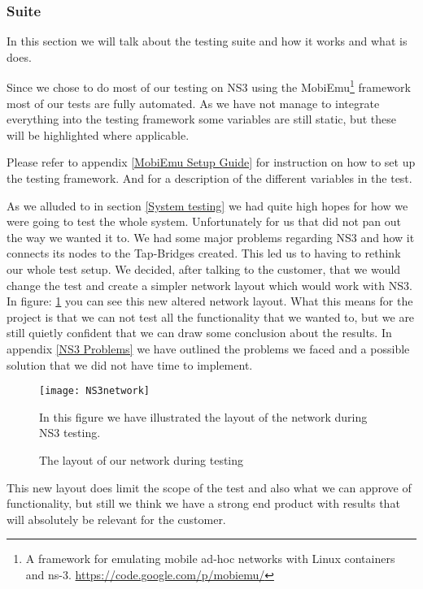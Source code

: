 \subsubsection{Suite}\label{Testing:About:Suite}
	In this section we will talk about the testing suite and how it works and what is does.
	
	Since we chose to do most of our testing on NS3 using the MobiEmu\footnote{A framework for emulating mobile ad-hoc networks with Linux containers and ns-3. \url{https://code.google.com/p/mobiemu/}} framework most of our tests are fully automated. As we have not manage to integrate everything into the testing framework some variables are still static, but these will be highlighted where applicable.

	\begin{shaded}
	Please refer to appendix \ref{MobiEmu Setup Guide} for instruction on how to set up the testing framework. And for a description of the different variables in the test.
	\end{shaded}
	
	As we alluded to in section \ref{System testing} we had quite high hopes for how we were going to test the whole system. Unfortunately for us that did not pan out the way we wanted it to. We had some major problems regarding NS3 and how it connects its nodes to the Tap-Bridges created. This led us to having to rethink our whole test setup. We decided, after talking to the customer, that we would change the test and create a simpler network layout which would work with NS3. In figure: \ref{fig:NS3network} you can see this new altered network layout. What this means for the project is that we can not test all the functionality that we wanted to, but we are still quietly confident that we can draw some conclusion about the results. In appendix \ref{NS3 Problems} we have outlined the problems we faced and a possible solution that we did not have time to implement.
	
	\begin{figure}[H]
        \centering
        \texttt{[image: NS3network]}
        \caption{The layout of our network during testing}
        In this figure we have illustrated the layout of the network during NS3 testing.
        \label{fig:NS3network}
    \end{figure}
    
    This new layout does limit the scope of the test and also what we can approve of functionality, but still we think we have a strong end product with results that will absolutely be relevant for the customer.
    
